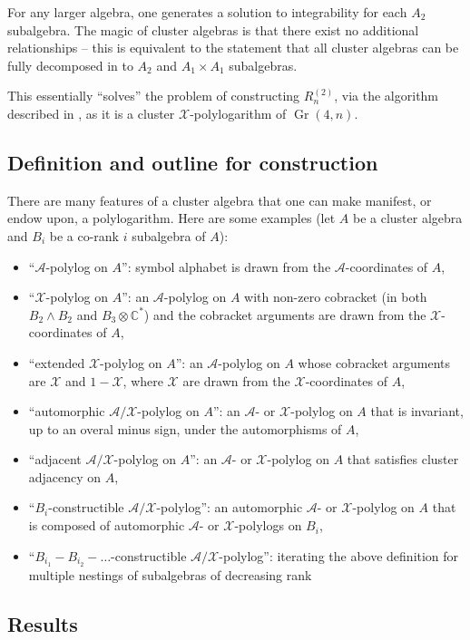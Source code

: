 \documentclass[11pt]{article}
\DeclareMathOperator{\Gr}{Gr}
\def\x{\mathcal{X}}
\def\xcoords{$\mathcal{X}$-coordinates }
\def\a{\mathcal{A}}
\def\acoords{$\mathcal{A}$-coordinates }
\def\rn{R^{(2)}_n}
\def\bb2{B_2\wedge B_2}
\def\b3c{B_3 \otimes \mathbb{C}^*}
\begin{document}
For any larger algebra, one generates a solution to integrability for each $A_2$ subalgebra. The magic of cluster algebras is that there exist no additional relationships -- this is equivalent to the statement that all cluster algebras can be fully decomposed in to $A_2$ and $A_1 \times A_1$ subalgebras. 

This essentially ``solves'' the problem of constructing $\rn$, via the algorithm described in \cite{Golden:2014xqf}, as it is a cluster $\x$-polylogarithm of $\Gr(4,n)$.


\subsection{Definition and outline for construction}

There are many features of a cluster algebra that one can make manifest, or endow upon, a polylogarithm. Here are some examples (let $A$ be a cluster algebra and $B_i$ be a co-rank $i$ subalgebra of $A$):
\begin{itemize}
	\item ``$\a$-polylog on $A$'': symbol alphabet is drawn from the \acoords of $A$,
	\item ``$\x$-polylog on $A$'': an $\a$-polylog on $A$ with non-zero cobracket (in both $\bb2$ and $\b3c$) and the cobracket arguments are drawn from the \xcoords of $A$,
	\item ``extended $\x$-polylog on $A$'': an $\a$-polylog on $A$ whose cobracket arguments are $\x$ and $1-\x$, where $\x$ are drawn from the \xcoords of $A$,
	\item ``automorphic $\a/\x$-polylog on $A$'': an $\a$- or $\x$-polylog on $A$ that is invariant, up to an overal minus sign, under the automorphisms of $A$,
	\item ``adjacent $\a/\x$-polylog on $A$'': an $\a$- or $\x$-polylog on $A$ that satisfies cluster adjacency on $A$,
	\item ``$B_i$-constructible $\a/\x$-polylog'': an automorphic $\a$- or $\x$-polylog on $A$ that is composed of automorphic $\a$- or $\x$-polylogs on $B_i$,
	\item ``$B_{i_1} - B_{i_2} - \ldots $-constructible $\a/\x$-polylog'': iterating the above definition for multiple nestings of subalgebras of decreasing rank
\end{itemize}


\subsection{Results}
\end{document}

